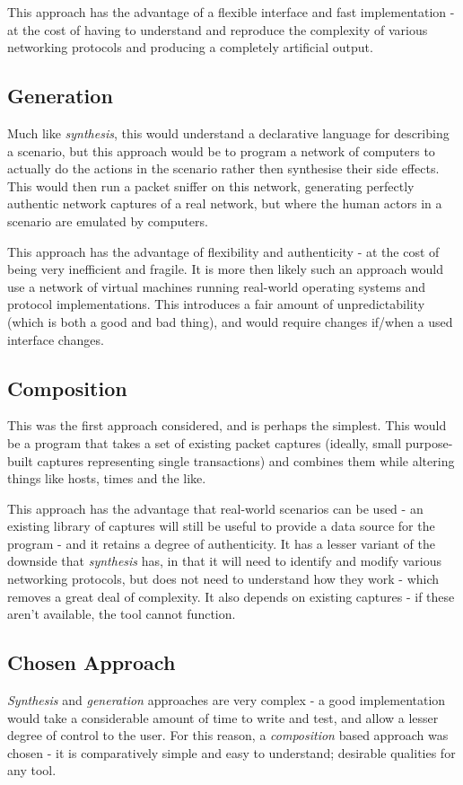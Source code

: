 \documentclass[10pt,a4paper,notitlepage]{report}
\begin{document}
This approach has the advantage of a flexible interface and fast implementation - at the cost of having to understand and reproduce the complexity of various networking protocols and producing a completely artificial output.

\subsection{Generation}
Much like \emph{synthesis}, this would understand a declarative language for describing a scenario, but this approach would be to program a network of computers to actually do the actions in the scenario rather then synthesise their side effects. This would then run a packet sniffer on this network, generating perfectly authentic network captures of a real network, but where the human actors in a scenario are emulated by computers.

This approach has the advantage of flexibility and authenticity - at the cost of being very inefficient and fragile. It is more then likely such an approach would use a network of virtual machines running real-world operating systems and protocol implementations. This introduces a fair amount of unpredictability (which is both a good and bad thing), and would require changes if/when a used interface changes.

\subsection{Composition}
This was the first approach considered, and is perhaps the simplest. This would be a program that takes a set of existing packet captures (ideally, small purpose-built captures representing single transactions) and combines them while altering things like hosts, times and the like.

This approach has the advantage that real-world scenarios can be used - an existing library of captures will still be useful to provide a data source for the program - and it retains a degree of authenticity. It has a lesser variant of the downside that \emph{synthesis} has, in that it will need to identify and modify various networking protocols, but does not need to understand how they work - which removes a great deal of complexity. It also depends on existing captures - if these aren't available, the tool cannot function.

\subsection{Chosen Approach}
\emph{Synthesis} and \emph{generation} approaches are very complex - a good implementation would take a considerable amount of time to write and test, and allow a lesser degree of control to the user. For this reason, a \emph{composition} based approach was chosen - it is comparatively simple and easy to understand; desirable qualities for any tool.
\end{document}
